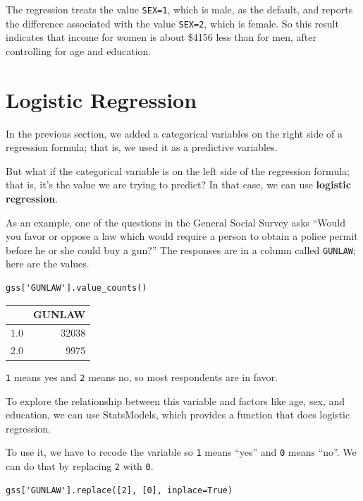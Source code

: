The regression treats the value \passthrough{\lstinline!SEX=1!}, which
is male, as the default, and reports the difference associated with the
value \passthrough{\lstinline!SEX=2!}, which is female. So this result
indicates that income for women is about \$4156 less than for men, after
controlling for age and education.

\hypertarget{logistic-regression}{%
\section{Logistic Regression}\label{logistic-regression}}

In the previous section, we added a categorical variables on the right
side of a regression formula; that is, we used it as a predictive
variables.

But what if the categorical variable is on the left side of the
regression formula; that is, it's the value we are trying to predict? In
that case, we can use \textbf{logistic regression}.

As an example, one of the questions in the General Social Survey asks
``Would you favor or oppose a law which would require a person to obtain
a police permit before he or she could buy a gun?'' The responses are in
a column called \passthrough{\lstinline!GUNLAW!}; here are the values.

\begin{lstlisting}[]
gss['GUNLAW'].value_counts()
\end{lstlisting}

\begin{tabular}{lr}
\midrule
{} &  GUNLAW \\
\midrule
1.0 &   32038 \\
2.0 &    9975 \\
\midrule
\end{tabular}

\passthrough{\lstinline!1!} means yes and \passthrough{\lstinline!2!}
means no, so most respondents are in favor.

To explore the relationship between this variable and factors like age,
sex, and education, we can use StatsModels, which provides a function
that does logistic regression.

To use it, we have to recode the variable so \passthrough{\lstinline!1!}
means ``yes'' and \passthrough{\lstinline!0!} means ``no''. We can do
that by replacing \passthrough{\lstinline!2!} with
\passthrough{\lstinline!0!}.

\begin{lstlisting}[]
gss['GUNLAW'].replace([2], [0], inplace=True)
\end{lstlisting}

